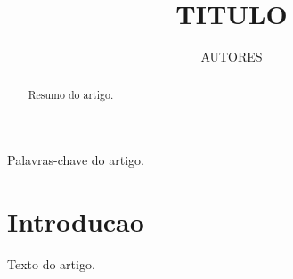 \documentclass[journal]{IEEEtran}
\begin{document}
\title{{TITULO}}

\author{
{AUTORES}
}

\maketitle

\begin{abstract}
Resumo do artigo.
\end{abstract}

\begin{IEEEkeywords}
Palavras-chave do artigo.
\end{IEEEkeywords}

\section{Introducao}

Texto do artigo.



\end{document}
